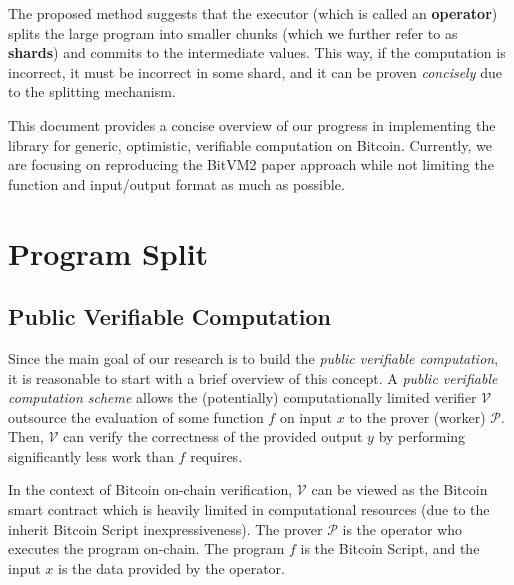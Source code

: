 \documentclass{iacrtrans}
\begin{document}
The proposed method suggests that the executor (which is called an
\textbf{operator}) splits the large program into smaller chunks (which we
further refer to as \textbf{shards}) and commits to the intermediate values.
This way, if the computation is incorrect, it must be incorrect in some shard,
and it can be proven \textit{concisely} due to the splitting mechanism.

This document provides a concise overview of our progress in implementing the
library for generic, optimistic, verifiable computation on Bitcoin. Currently,
we are focusing on reproducing the BitVM2 paper approach while not limiting the
function and input/output format as much as possible.

\section{Program Split}\label{sec:program-splitting}

\subsection{Public Verifiable Computation}

Since the main goal of our research is to build the \textit{public verifiable
computation}, it is reasonable to start with a brief overview of this concept. A
\textit{public verifiable computation scheme} allows the (potentially)
computationally limited verifier $\mathcal{V}$ outsource the evaluation of some
function $f$ on input $x$ to the prover (worker) $\mathcal{P}$. Then,
$\mathcal{V}$ can verify the correctness of the provided output $y$ by
performing significantly less work than $f$ requires. 

In the context of Bitcoin on-chain verification, $\mathcal{V}$ can be viewed as
the Bitcoin smart contract which is heavily limited in computational resources
(due to the inherit Bitcoin Script inexpressiveness). The prover $\mathcal{P}$
is the operator who executes the program on-chain. The program $f$ is the
Bitcoin Script, and the input $x$ is the data provided by the operator. 
\end{document}
